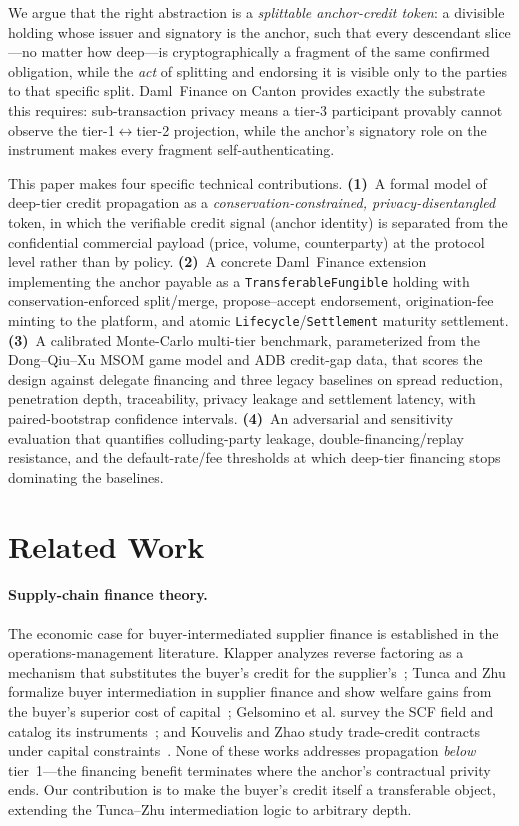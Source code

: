 \documentclass[10pt,twocolumn,letterpaper]{article}
\begin{document}
We argue that the right abstraction is a \emph{splittable anchor-credit token}: a
divisible holding whose issuer and signatory is the anchor, such that every
descendant slice---no matter how deep---is cryptographically a fragment of the same
confirmed obligation, while the \emph{act} of splitting and endorsing it is visible
only to the parties to that specific split. Daml~Finance on Canton provides exactly
the substrate this requires: sub-transaction privacy means a tier-3 participant
provably cannot observe the tier-1$\leftrightarrow$tier-2 projection, while the
anchor's signatory role on the instrument makes every fragment self-authenticating.

This paper makes four specific technical contributions.
\textbf{(1)}~A formal model of deep-tier credit propagation as a
\emph{conservation-constrained, privacy-disentangled} token, in which the verifiable
credit signal (anchor identity) is separated from the confidential commercial payload
(price, volume, counterparty) at the protocol level rather than by policy.
\textbf{(2)}~A concrete Daml~Finance extension implementing the anchor payable as a
\texttt{TransferableFungible} holding with conservation-enforced split/merge,
propose--accept endorsement, origination-fee minting to the platform, and atomic
\texttt{Lifecycle}/\texttt{Settlement} maturity settlement.
\textbf{(3)}~A calibrated Monte-Carlo multi-tier benchmark, parameterized from the
Dong--Qiu--Xu MSOM game model and ADB credit-gap data, that scores the design against
delegate financing and three legacy baselines on spread reduction, penetration depth,
traceability, privacy leakage and settlement latency, with paired-bootstrap
confidence intervals.
\textbf{(4)}~An adversarial and sensitivity evaluation that quantifies colluding-party
leakage, double-financing/replay resistance, and the default-rate/fee thresholds at
which deep-tier financing stops dominating the baselines.

\section{Related Work}

\paragraph{Supply-chain finance theory.} The economic case for buyer-intermediated
supplier finance is established in the operations-management literature. Klapper
analyzes reverse factoring as a mechanism that substitutes the buyer's credit for the
supplier's~\cite{klapper2006}; Tunca and Zhu formalize buyer intermediation in
supplier finance and show welfare gains from the buyer's superior cost of
capital~\cite{tunca2018}; Gelsomino et al. survey the SCF field and catalog its
instruments~\cite{gelsomino2016}; and Kouvelis and Zhao study trade-credit
contracts under capital constraints~\cite{kouvelis2012}. None of these works
addresses propagation \emph{below} tier~1---the financing benefit terminates where
the anchor's contractual privity ends. Our contribution is to make the buyer's credit
itself a transferable object, extending the Tunca--Zhu intermediation logic to
arbitrary depth.
\end{document}
